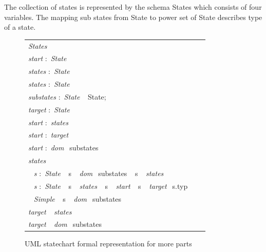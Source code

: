 The collection of states is represented by the schema
States which consists of four variables. The mapping
sub states from State to power set of State describes type
of a state.
 \begin{figure}[ht!]
 	\centering
 	\begin{tabular}{lll}
 		\footnotesize                       
 		\textit{States}          \\
 		\footnotesize                       
 		\textit{start}          
 		$:$  \textit{State}\\
 		
 		\textit{states}          
 		$:$  \textit{State}\\
 		
 		\textit{states}           
 		$:$  \textit{State}\\
 		\footnotesize
 		\textit{substates}            $:$         \textit{State} $\ \  $ {State};       \\   
 		\footnotesize
 		\textit{target}             $:$         \textit{State}    \\
 		 \footnotesize                       
 		 \textit{start}           
 		 $:$  \textit{states}\\
 		  \footnotesize                       
 		  \textit{start}          
 		  $:$ \textit{target}\\
 		   \footnotesize                       
 		   \textit{start}           
 		   $:$  \textit{dom} $\ \  ${substates}\\
 		   
 		   \footnotesize                       
 		   \textit{states}          \\ 		
 		$\ \  $ \textit{s}      $:$     \textit{State} $\ \  $ {s} $\ \  $ \textit{dom} $\ \  ${substates} $\ \  $ {s} $\ \  $ \textit{states}        \\ 
 		$\ \  $ \textit{s}      $:$     \textit{State} $\ \  $ {s} $\ \  $ \textit{states} $\ \  $ {s} $\ \  $ \textit{start} $\ \  $ {s} $\ \  $ \textit{target}$\ \  $ {s.typ}\\ 
 		$\ \  $ \textit{Simple} $\ \  $ {s} $\ \  $ \textit{dom} $\ \  ${substates}\\
 		\footnotesize                       
 		\textit{target}  $\ \  $ \textit{states}        \\ 
 		\footnotesize                       
 		\textit{target}  $\ \  $ \textit{dom} $\ \  ${substates}\\	
 	\end{tabular}
 	\vspace{1em}
 	\caption{UML statechart formal representation for more parts}
 	\label{statechart_formal_representation_invariants}
 	\end{figure}

